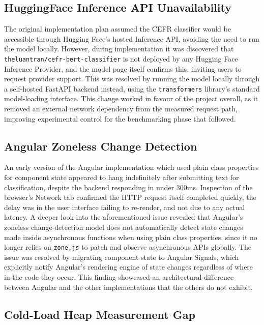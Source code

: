 \documentclass[11pt,a4paper]{report}
\begin{document}
\subsection{HuggingFace Inference API Unavailability}

The original implementation plan assumed the CEFR classifier would be accessible through Hugging Face's hosted Inference API, avoiding the need to run the model locally. However, during implementation it was discovered that \texttt{theluantran/cefr-bert-classifier} is not deployed by any Hugging Face Inference Provider, and the model page itself confirms this, inviting users to request provider support. This was resolved by running the model locally through a self-hosted FastAPI backend instead, using the \texttt{transformers} library's standard model-loading interface. This change worked in favour of the project overall, as it removed an external network dependency from the measured request path, improving experimental control for the benchmarking phase that followed.

\subsection{Angular Zoneless Change Detection}
\label{sec:angular-signals-bug}

An early version of the Angular implementation which used plain class properties for component state appeared to hang indefinitely after submitting text for classification, despite the backend responding in under 300ms. Inspection of the browser's Network tab confirmed the HTTP request itself completed quickly, the delay was in the user interface failing to re-render, and not due to any actual latency. A deeper look into the aforementioned issue revealed that Angular's zoneless change-detection model does not automatically detect state changes made inside asynchronous functions when using plain class properties, since it no longer relies on \texttt{zone.js} to patch and observe asynchronous APIs globally. The issue was resolved by migrating component state to Angular Signals, which explicitly notify Angular's rendering engine of state changes regardless of where in the code they occur.
This finding showcased an architectural difference between Angular and the other implementations that the others do not exhibit.

\subsection{Cold-Load Heap Measurement Gap}
\end{document}
